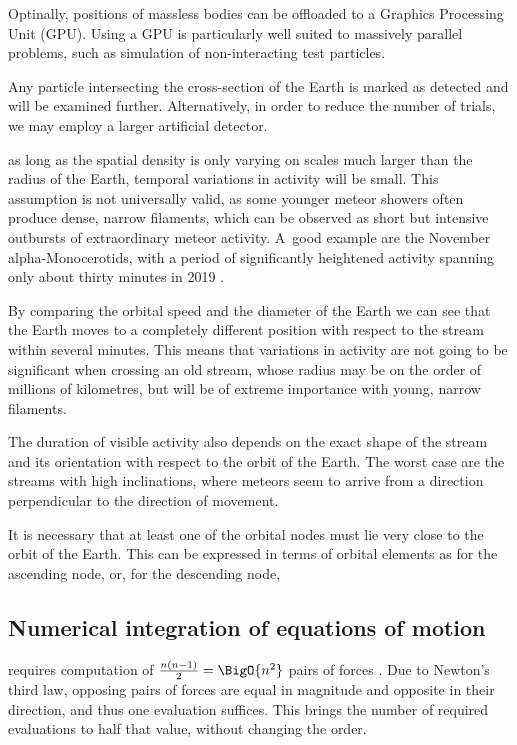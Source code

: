     Optinally, positions of massless bodies can be offloaded to a Graphics Processing Unit (GPU).
    Using a GPU is particularly well suited to massively parallel problems, such as simulation of non-interacting test particles.

    Any particle intersecting the cross-section of the Earth is marked as detected and will be examined further.
    Alternatively, in order to reduce the number of trials, we may employ a larger artificial detector.


    as long as the spatial density is only varying on scales much larger than the radius of the Earth,
    temporal variations in activity will be small.
    This assumption is not universally valid, as some younger meteor showers often produce dense, narrow filaments,
    which can be observed as short but intensive outbursts of extraordinary meteor activity.
    A~good example are the November alpha-Monocerotids, with a period of significantly
    heightened activity spanning only about thirty minutes in 2019 \citep{CBET4692}.

    By comparing the orbital speed and the diameter of the Earth we can see that the Earth moves
    to a completely different position with respect to the stream within several minutes.
    This means that variations in activity are not going to be significant when crossing an old stream,
    whose radius may be on the order of millions of kilometres, but will be of extreme importance with young, narrow filaments.

    The duration of visible activity also depends on the exact shape of the stream and its orientation with respect to the orbit of the Earth.
    The worst case are the streams with high inclinations, where meteors seem to arrive from a direction perpendicular
    to the direction of movement.



    It is necessary that at least one of the orbital nodes must lie very close to the orbit of the Earth.
    This can be expressed in terms of orbital elements as
    for the ascending node, or, for the descending node,

    \subsection{Numerical integration of equations of motion} \label{asi}
        requires computation of $\frac{n\left(n - 1\right)}{2} = \BigO{n^2}$ pairs of forces \cite{...}.
        Due to Newton's third law, opposing pairs of forces are equal in magnitude and opposite in their direction,
        and thus one evaluation suffices. This brings the number of required evaluations to half that value,
        without changing the order.


